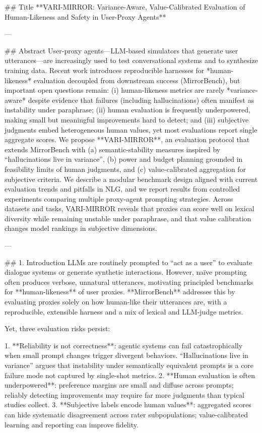 ## Title  
**VARI-MIRROR: Variance-Aware, Value-Calibrated Evaluation of Human-Likeness and Safety in User-Proxy Agents**

---

## Abstract  
User-proxy agents—LLM-based simulators that generate user utterances—are increasingly used to test conversational systems and to synthesize training data. Recent work introduces reproducible harnesses for *human-likeness* evaluation decoupled from downstream success (MirrorBench), but important open questions remain: (i) human-likeness metrics are rarely *variance-aware* despite evidence that failures (including hallucinations) often manifest as instability under paraphrase; (ii) human evaluation is frequently underpowered, making small but meaningful improvements hard to detect; and (iii) subjective judgments embed heterogeneous human values, yet most evaluations report single aggregate scores. We propose **VARI-MIRROR**, an evaluation protocol that extends MirrorBench with (a) semantic-stability measures inspired by “hallucinations live in variance”, (b) power and budget planning grounded in feasibility limits of human judgments, and (c) value-calibrated aggregation for subjective criteria. We describe a modular benchmark design aligned with current evaluation trends and pitfalls in NLG, and we report results from controlled experiments comparing multiple proxy-agent prompting strategies. Across datasets and tasks, VARI-MIRROR reveals that proxies can score well on lexical diversity while remaining unstable under paraphrase, and that value calibration changes model rankings in subjective dimensions.

---

## 1. Introduction  
LLMs are routinely prompted to “act as a user” to evaluate dialogue systems or generate synthetic interactions. However, naïve prompting often produces verbose, unnatural utterances, motivating principled benchmarks for **human-likeness** of user proxies. **MirrorBench** addresses this by evaluating proxies solely on how human-like their utterances are, with a reproducible, extensible harness and a mix of lexical and LLM-judge metrics.

Yet, three evaluation risks persist:

1. **Reliability is not correctness**: agentic systems can fail catastrophically when small prompt changes trigger divergent behaviors. “Hallucinations live in variance” argues that instability under semantically equivalent prompts is a core failure mode not captured by single-shot metrics.  
2. **Human evaluation is often underpowered**: preference margins are small and diffuse across prompts; reliably detecting improvements may require far more judgments than typical studies collect.  
3. **Subjective labels encode human values**: aggregated scores can hide systematic disagreement across rater subpopulations; value-calibrated learning and reporting can improve fidelity.

